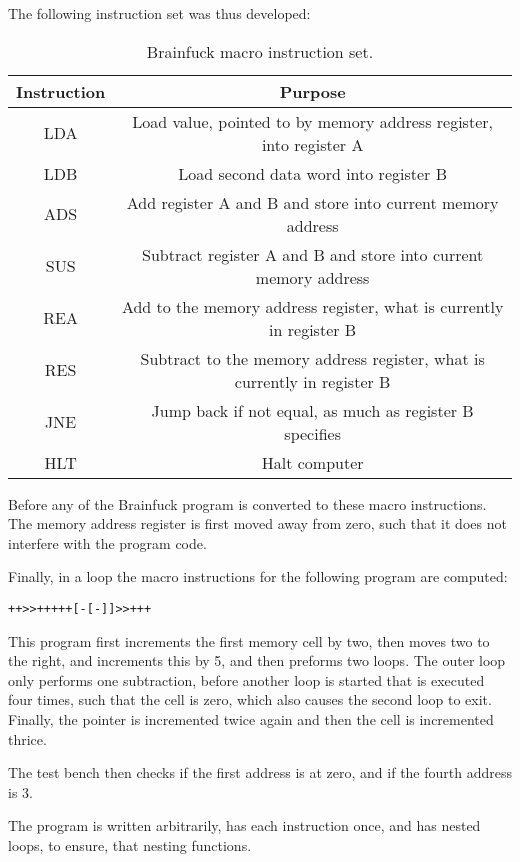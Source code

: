 The following instruction set was thus developed:
\begin{table}[H]
    \begin{centering}
    \begin{tabular}{cc}
    Instruction & Purpose                                                                  \\ \hline
    LDA         & Load value, pointed to by memory address register, into register A       \\
    LDB         & Load second data word into register B                                    \\
    ADS         & Add register A and B and store into current memory address               \\
    SUS         & Subtract register A and B and store into current memory address          \\
    REA         & Add to the memory address register, what is currently in register B      \\
    RES         & Subtract to the memory address register, what is currently in register B \\
    JNE         & Jump back if not equal, as much as register B specifies                  \\
    HLT         & Halt computer                                                           
    \end{tabular}
\end{centering}
    \caption{Brainfuck macro instruction set.}
    \label{tab:brainfuck-macro-instructions}
    \end{table}

Before any of the Brainfuck program is converted to these macro instructions. The memory address register is first moved away from zero, such that it does not interfere with the program code.

Finally, in a loop the macro instructions for the following program are computed: 

\begin{lstlisting}[caption=Brainfuck program, label=lst:brainfuck]
    ++>>+++++[-[-]]>>+++
\end{lstlisting}

This program first increments the first memory cell by two, then moves two to the right, and increments this by 5, and then preforms two loops. The outer loop only performs one subtraction, before another loop is started that is executed four times, such that the cell is zero, which also causes the second loop to exit. Finally, the pointer is incremented twice again and then the cell is incremented thrice. 

The test bench then checks if the first address is at zero, and if the fourth address is 3.

The program is written arbitrarily, has each instruction once, and has nested loops, to ensure, that nesting functions. 


